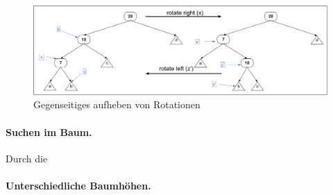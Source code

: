 \documentclass[a4paper,12pt]{article}
\begin{document}
\begin{figure}[h]
	\centering
	\includegraphics[width= 1.2\textwidth]{"Medien/Einleitung/LinksRechtsRotation"}
	\caption{Gegenseitiges aufheben von Rotationen}
	\label{fig:LinksRechtsRotation}
\end{figure}

\paragraph{Suchen im Baum.} Durch die  
\paragraph{Unterschiedliche Baumhöhen.} 





\end{document}
